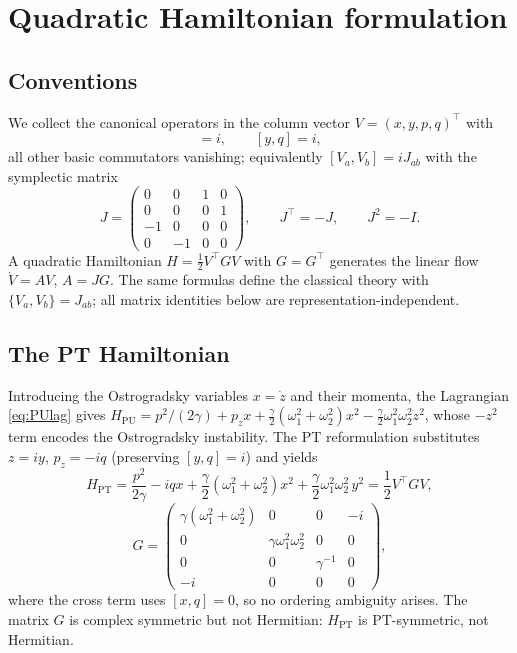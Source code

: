 \documentclass[11pt]{article}
\theoremstyle{definition}
\theoremstyle{remark}
\newcommand{\w}{\omega}
\begin{document}
\section{Quadratic Hamiltonian formulation}\label{sec:setup}

\subsection{Conventions}

We collect the canonical operators in the column vector $V=(x,y,p,q)^{\top}$
with
\begin{equation}
[x,p]=i,\qquad [y,q]=i,
\end{equation}
all other basic commutators vanishing; equivalently $[V_a,V_b]=iJ_{ab}$ with
the symplectic matrix
\begin{equation}
J=\begin{pmatrix}0&0&1&0\\0&0&0&1\\-1&0&0&0\\0&-1&0&0\end{pmatrix},
\qquad J^{\top}=-J,\qquad J^2=-I .
\end{equation}
A quadratic Hamiltonian $H=\tfrac12V^{\top}GV$ with $G=G^{\top}$ generates the
linear flow $\dot V=AV$, $A=JG$.  The same formulas define the classical
theory with $\{V_a,V_b\}=J_{ab}$; all matrix identities below are
representation-independent.

\subsection{The PT Hamiltonian}

Introducing the Ostrogradsky variables $x=\dot z$ and their momenta, the
Lagrangian \eqref{eq:PUlag} gives
$H_{\mathrm{PU}}=p^2/(2\gamma)+p_z x
+\tfrac{\gamma}{2}(\w_1^2+\w_2^2)x^2-\tfrac{\gamma}{2}\w_1^2\w_2^2 z^2$,
whose $-z^2$ term encodes the Ostrogradsky instability.  The PT reformulation
\cite{BM2008PRL,BM2008PRD} substitutes $z=iy$, $p_z=-iq$ (preserving
$[y,q]=i$) and yields
\begin{equation}\label{eq:HPT}
H_{\mathrm{PT}}
=\frac{p^2}{2\gamma}-iqx
+\frac{\gamma}{2}(\w_1^2+\w_2^2)x^2
+\frac{\gamma}{2}\w_1^2\w_2^2\,y^2
=\frac12 V^{\top}GV,
\end{equation}
\begin{equation}\label{eq:G}
G=\begin{pmatrix}
\gamma(\w_1^2+\w_2^2)&0&0&-i\\
0&\gamma\w_1^2\w_2^2&0&0\\
0&0&\gamma^{-1}&0\\
-i&0&0&0
\end{pmatrix},
\end{equation}
where the cross term uses $[x,q]=0$, so no ordering ambiguity arises.  The
matrix $G$ is complex symmetric but not Hermitian: $H_{\mathrm{PT}}$ is
PT-symmetric, not Hermitian.
\end{document}
